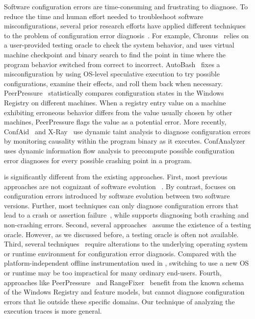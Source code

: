 Software configuration errors are time-consuming
and frustrating to diagnose. To reduce the time and human
effort needed to troubleshoot software misconfigurations,
several prior research efforts have applied different techniques
to the problem of configuration error diagnosis~\cite{Attariyan:2008:UCD, 
Whitaker:2004:CDS, Wang:2004:AMT, rangefix,
Attariyan:2010:ACT, Rabkin:2011:PPC, keller:conferr}.
For example, Chronus~\cite{Whitaker:2004:CDS} relies
on a user-provided testing oracle to check the system behavior,
and uses
virtual machine checkpoint and binary search to find the
point in time where the program behavior
switched from correct to incorrect. AutoBash~\cite{Su:2007:AIC}
fixes a misconfiguration by using
OS-level speculative execution to try possible
configurations, examine their effects, and roll them back when necessary.
PeerPressure~\cite{Wang:2004:AMT} statistically
compares
configuration states in the Windows Registry on different machines.
When a registry entry value on a machine exhibiting erroneous behavior differs
from the value usually chosen by other machines, PeerPressure
flags the value as a potential error. More recently, 
ConfAid~\cite{Attariyan:2010:ACT} and X-Ray~\cite{xray}
use dynamic taint analysis to diagnose configuration errors
by monitoring causality within the program binary as it executes.
ConfAnalyzer~\cite{Rabkin:2011:PPC} uses dynamic information flow analysis to precompute
possible configuration error diagnoses for every possible crashing point
in a program. 

\ourtool is significantly different from the existing approaches.
First, most previous approaches are not cognizant of software evolution
~\cite{Attariyan:2008:UCD, Whitaker:2004:CDS, 
Attariyan:2010:ACT, Rabkin:2011:PPC}. By contrast, \ourtool focuses
on configuration errors introduced by software evolution between
two software versions. Further, most techniques
can only diagnose configuration errors that lead to a crash or
assertion failure~\cite{Attariyan:2008:UCD, Whitaker:2004:CDS, 
Attariyan:2010:ACT, Rabkin:2011:PPC}, while \ourtool supports diagnosing both
crashing and non-crashing errors.
Second, several approaches~\cite{Attariyan:2010:ACT, Whitaker:2004:CDS}
assume the existence of a testing oracle.
However, as we discussed
before, a testing oracle is often not available.
Third, several techniques~\cite{Whitaker:2004:CDS, Su:2007:AIC} require alterations
to the underlying operating system or runtime environment
for configuration error diagnosis. Compared with
the platform-independent offline instrumentation used
in \ourtool, switching to use a new OS or runtime may be
too impractical for many ordinary end-users.
Fourth, approaches like
PeerPressure~\cite{Wang:2004:AMT} and RangeFixer~\cite{rangefix}
benefit from the known schema of the Windows Registry and
feature models, but cannot diagnose configuration errors
that lie outside these specific domains. Our technique
of analyzing the execution traces is more general.


